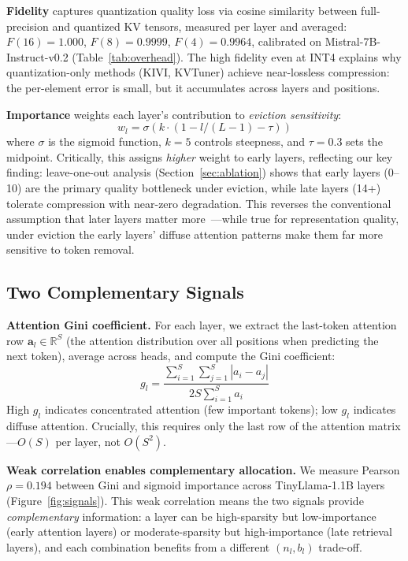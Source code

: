 \documentclass{article}
\newcommand{\nlayers}{L}
\begin{document}
\textbf{Fidelity} captures quantization quality loss via cosine similarity between full-precision and quantized KV tensors, measured per layer and averaged:
$F(16) = 1.000$, $F(8) = 0.9999$, $F(4) = 0.9964$, calibrated on Mistral-7B-Instruct-v0.2 (Table~\ref{tab:overhead}).
The high fidelity even at INT4 explains why quantization-only methods (KIVI, KVTuner) achieve near-lossless compression: the per-element error is small, but it accumulates across layers and positions.

\textbf{Importance} weights each layer's contribution to \emph{eviction sensitivity}:
\begin{equation}
w_l = \sigma(k \cdot (1 - l/(\nlayers-1) - \tau))
\label{eq:importance}
\end{equation}
where $\sigma$ is the sigmoid function, $k=5$ controls steepness, and $\tau=0.3$ sets the midpoint.
Critically, this assigns \emph{higher} weight to early layers, reflecting our key finding: leave-one-out analysis (Section~\ref{sec:ablation}) shows that early layers (0--10) are the primary quality bottleneck under eviction, while late layers (14+) tolerate compression with near-zero degradation.
This reverses the conventional assumption that later layers matter more~\citep{geva2023dissecting}---while true for representation quality, under eviction the early layers' diffuse attention patterns make them far more sensitive to token removal.

\subsection{Two Complementary Signals}
\label{sec:signals}

\textbf{Attention Gini coefficient.}
For each layer, we extract the last-token attention row $\mathbf{a}_l \in \mathbb{R}^S$ (the attention distribution over all positions when predicting the next token), average across heads, and compute the Gini coefficient:
\begin{equation}
g_l = \frac{\sum_{i=1}^S \sum_{j=1}^S |a_i - a_j|}{2S \sum_{i=1}^S a_i}
\label{eq:gini}
\end{equation}
High $g_l$ indicates concentrated attention (few important tokens); low $g_l$ indicates diffuse attention.
Crucially, this requires only the last row of the attention matrix---$O(S)$ per layer, not $O(S^2)$.

\textbf{Weak correlation enables complementary allocation.}
We measure Pearson $\rho = 0.194$ between Gini and sigmoid importance across TinyLlama-1.1B layers (Figure~\ref{fig:signals}).
This weak correlation means the two signals provide \emph{complementary} information: a layer can be high-sparsity but low-importance (early attention layers) or moderate-sparsity but high-importance (late retrieval layers), and each combination benefits from a different $(n_l, b_l)$ trade-off.
\end{document}
